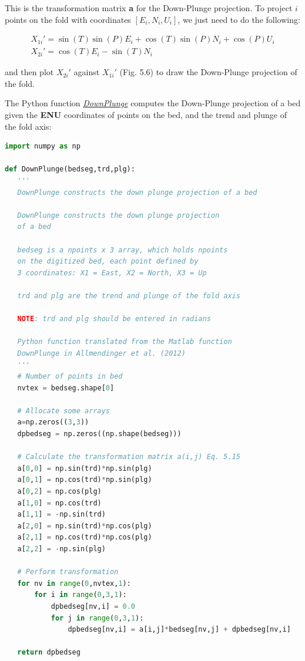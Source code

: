 \documentclass[a4paper , 12pt]{book}
\begin{document}
This is the transformation matrix \textbf{a} for the Down-Plunge projection. To project $i$ points on the fold with coordinates $[E_i,N_i,U_i]$, we just need to do the following:

\begin{equation}
    \begin{split}
        X_{1i}'=\sin(T)\sin(P)E_i+\cos(T)\sin(P)N_i+\cos(P)U_i \\
        X_{2i}'=\cos(T)E_i-\sin(T)N_i  \hspace{60pt}
    \end{split}
\end{equation}

and then plot $X_{2i}'$ against $X_{1i}'$ (Fig. 5.6) to draw the Down-Plunge projection of the fold.

The Python function \href{http://github.com}{\textit{DownPlunge}} computes the Down-Plunge projection of a bed given the \textbf{ENU} coordinates of points on the bed, and the trend and plunge of the fold axis:

\begin{lstlisting}[language=Python, frame=single]
import numpy as np

def DownPlunge(bedseg,trd,plg):
   '''
   DownPlunge constructs the down plunge projection of a bed

   DownPlunge constructs the down plunge projection
   of a bed

   bedseg is a npoints x 3 array, which holds npoints 
   on the digitized bed, each point defined by
   3 coordinates: X1 = East, X2 = North, X3 = Up

   trd and plg are the trend and plunge of the fold axis

   NOTE: trd and plg should be entered in radians

   Python function translated from the Matlab function 
   DownPlunge in Allmendinger et al. (2012)
   '''
   # Number of points in bed
   nvtex = bedseg.shape[0]

   # Allocate some arrays
   a=np.zeros((3,3))
   dpbedseg = np.zeros((np.shape(bedseg)))
   
   # Calculate the transformation matrix a(i,j) Eq. 5.15
   a[0,0] = np.sin(trd)*np.sin(plg)
   a[0,1] = np.cos(trd)*np.sin(plg)
   a[0,2] = np.cos(plg)
   a[1,0] = np.cos(trd)
   a[1,1] = -np.sin(trd)
   a[2,0] = np.sin(trd)*np.cos(plg)
   a[2,1] = np.cos(trd)*np.cos(plg)
   a[2,2] = -np.sin(plg)
    
   # Perform transformation
   for nv in range(0,nvtex,1):
       for i in range(0,3,1):
           dpbedseg[nv,i] = 0.0
           for j in range(0,3,1):
               dpbedseg[nv,i] = a[i,j]*bedseg[nv,j] + dpbedseg[nv,i]
                
   return dpbedseg
\end{lstlisting}
\end{document}
